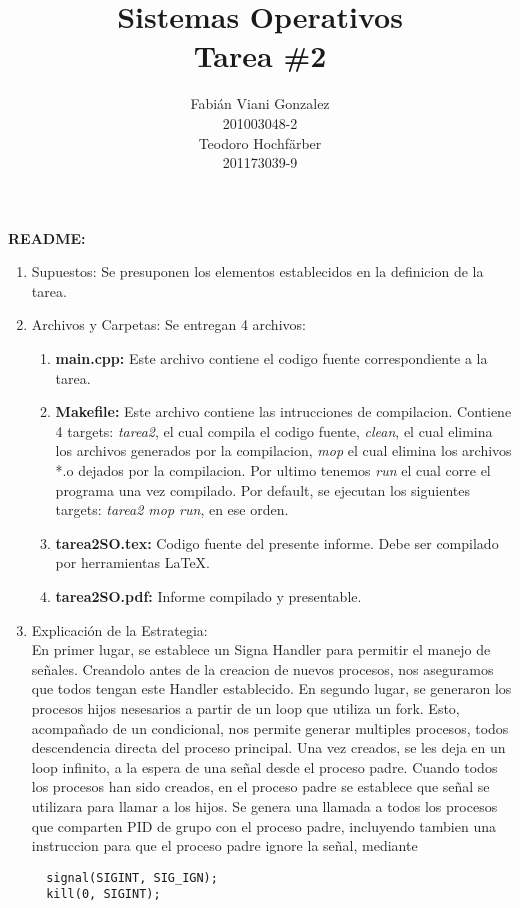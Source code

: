 \documentclass[spanish, fleqn]{article}
\title{Sistemas Operativos \\
       Tarea \#2
      }
\author{Fabián Viani Gonzalez \\
	201003048-2\\
	Teodoro Hochfärber\\
	201173039-9
       }
\begin{document}
\maketitle
\thispagestyle{empty}
\textbf{\Large{README:}}\\
\begin{enumerate}
 \item Supuestos:
 Se presuponen los elementos establecidos en la definicion de la tarea.
 \item Archivos y Carpetas:
 Se entregan 4 archivos:
 \begin{enumerate}
  \item \textbf{main.cpp:} Este archivo contiene el codigo fuente correspondiente a la tarea.
  \item \textbf{Makefile:} Este archivo contiene las intrucciones de compilacion. Contiene 4 targets: \emph{tarea2}, el cual compila el codigo fuente,
  \emph{clean}, el cual elimina los archivos generados por la compilacion, \emph{mop} el cual elimina los archivos *.o dejados por la compilacion.
  Por ultimo tenemos \emph{run} el cual corre el programa una vez compilado. Por default, se ejecutan los siguientes targets: \emph{tarea2 mop run}, en ese orden.
  \item \textbf{tarea2SO.tex:} Codigo fuente del presente informe. Debe ser compilado por herramientas LaTeX.
  \item \textbf{tarea2SO.pdf:} Informe compilado y presentable.
 \end{enumerate}

 \item Explicación de la Estrategia: \\
 En primer lugar, se establece un Signa Handler para permitir el manejo de señales. Creandolo antes de la creacion de nuevos procesos, nos aseguramos que todos tengan este Handler establecido. En segundo lugar, se generaron los procesos hijos nesesarios a partir de un loop que utiliza un fork.  Esto, acompañado de un condicional, nos permite generar multiples procesos, todos descendencia directa del proceso principal. Una vez creados, se les deja en un loop infinito, a la espera de una señal desde el proceso padre. Cuando todos los procesos han sido creados, en el proceso padre se establece que señal se utilizara para llamar a los hijos. Se genera una llamada a todos los procesos que comparten PID de grupo con el proceso padre, incluyendo tambien una instruccion para que el proceso padre ignore la señal, mediante
 \begin{lstlisting}
  signal(SIGINT, SIG_IGN);
  kill(0, SIGINT);
 \end{lstlisting}
 

\end{enumerate}
\end{document}
